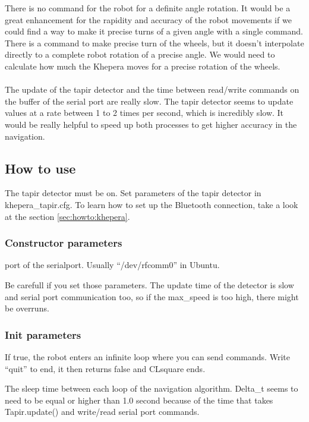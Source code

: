 There is no command for the robot for a definite angle rotation. It 
would be a great enhancement for the rapidity and accuracy of the robot 
movements if we could find a way to make it precise turns of a given 
angle with a single command. There is a command to make precise turn 
of the wheels, but it doesn’t interpolate directly to a complete robot 
rotation of a precise angle. We would need to calculate how much the 
Khepera moves for a precise rotation of the wheels.
\\
\\
The update of the tapir detector and the time between read/write commands 
on the buffer of the serial port are really slow. The tapir detector 
seems to update values at a rate between 1 to 2 times per second, 
which is incredibly slow. It would be really helpful to speed up both 
processes to get higher accuracy in the navigation.

\subsection{How to use}
\label{sec:dk:howto}
The tapir detector must be on. Set parameters of the tapir detector in 
khepera\_tapir.cfg. To learn how to set up the Bluetooth connection, 
take a look at the section \ref{sec:howto:khepera}.

\subsubsection{Constructor parameters}
\label{sec:dk:howto:constparams}
    \begin{description} \itemindent=-15pt
        \item[PORT] port of the serialport. Usually “/dev/rfcomm0” in 
            Ubuntu.
        \item[max\_speed, min\_speed (optional)] Be carefull if you set 
            those parameters. The update time of the detector is slow 
            and serial port communication too, so if the max\_speed is 
            too high, there might be overruns.
    \end{description}

\subsubsection{Init parameters}
\label{sec:dk:howto:initparams}
    \begin{description} \itemindent=-15pt
        \item[manipulate] If true, the robot enters an infinite loop where 
            you can send commands. Write “quit” to end, it then returns 
            false and CLsquare ends.
        \item[delta\_t] The sleep time between each loop of the 
            navigation algorithm. Delta\_t seems to need to be equal 
            or higher than 1.0 second because of the time that 
            takes Tapir.update() and write/read serial port commands.
    \end{description}
